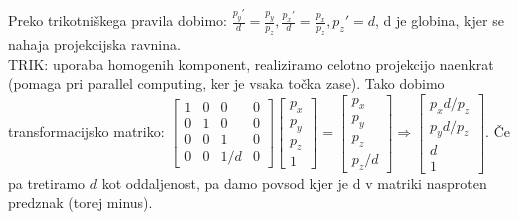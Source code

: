\documentclass{article}
\begin{document}
\begin{itemize}
     Preko trikotniškega pravila dobimo: $\frac{p_y'}{d} = \frac{p_y}{p_z}, \frac{p_x'}{d} = \frac{p_x}{p_z}, p_z' = d$, d je globina, kjer se nahaja projekcijska ravnina. \\ TRIK: uporaba homogenih komponent, realiziramo celotno projekcijo naenkrat (pomaga pri parallel computing, ker je vsaka točka zase). Tako dobimo transformacijsko matriko: $\begin{bmatrix} 1 & 0 & 0 & 0 \\ 0 & 1 & 0 & 0 \\ 0 & 0 & 1 & 0 \\ 0 & 0 & 1/d & 0 \end{bmatrix} \begin{bmatrix} p_x \\ p_y \\ p_z \\ 1 \end{bmatrix} = \begin{bmatrix} p_x \\ p_y \\ p_z \\ p_z/d \end{bmatrix} \Longrightarrow \begin{bmatrix} p_xd/p_z \\ p_yd/p_z \\ d \\ 1 \end{bmatrix}$. Če pa tretiramo $d$ kot oddaljenost, pa damo povsod kjer je d v matriki nasproten predznak (torej minus).
\end{itemize}
\end{document}

